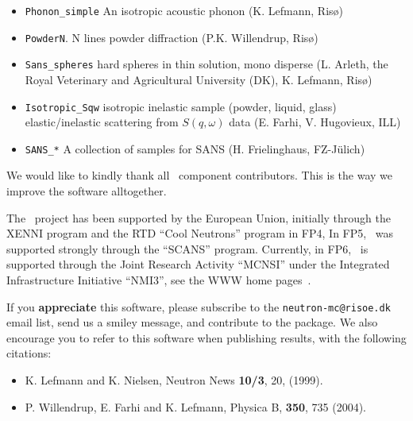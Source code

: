 \begin{itemize}
\begin{itemize}
  \item \verb+Phonon_simple+ An isotropic acoustic phonon (K. Lefmann, Ris\o)
  \item \verb+PowderN+. N lines powder diffraction (P.K. Willendrup, Ris\o)
  \item \verb+Sans_spheres+ hard spheres in thin solution, mono disperse (L. Arleth, the Royal Veterinary and Agricultural University (DK), K. Lefmann, Ris\o )
  \item \verb+Isotropic_Sqw+ isotropic inelastic sample (powder, liquid, glass)
elastic/inelastic scattering from $S(q,\omega)$ data (E. Farhi, V. Hugovieux, ILL)
  \item \verb+SANS_*+ A collection of samples for SANS (H. Frielinghaus,  FZ-J\"ulich)
  \end{itemize}
\end{itemize}

We would like to kindly thank all \MCS\ component contributors. This is the way we improve the software alltogether.

The \MCS\ project has been supported by the European Union, initially
through the XENNI program and the RTD ``Cool Neutrons'' program in FP4,
In FP5, \MCS\ was supported strongly through the
``SCANS'' program.
Currently, in FP6, \MCS\ is supported through the Joint Research Activity
``MCNSI'' under the Integrated Infrastructure Initiative ``NMI3'', see
the WWW home pages~\cite{mcnsi_webpage,nmi3_webpage}.

If you {\bf appreciate} this software, please subscribe to the \verb+neutron-mc@risoe.dk+ email list, send us a smiley message, and contribute to the package. We also encourage you to refer to this software when publishing results, with the following citations:
\begin{itemize}
\item{K. Lefmann and K. Nielsen, Neutron News {\bf 10/3}, 20, (1999).}
\item{P. Willendrup, E. Farhi and K. Lefmann, Physica B, {\bf 350}, 735 (2004).}
\end{itemize}






